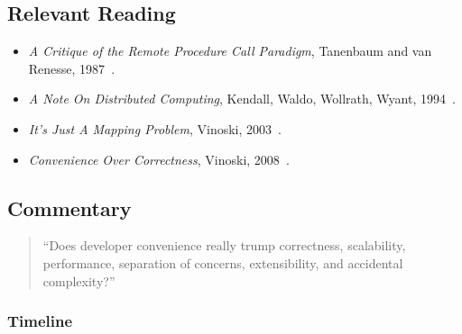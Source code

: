 \subsection{Relevant Reading}

\begin{itemize}
	\item \textit{A Critique of the Remote Procedure Call Paradigm}, Tanenbaum and van Renesse, 1987~\cite{tanenbaum1987critique}.
	\item \textit{A Note On Distributed Computing}, Kendall, Waldo, Wollrath, Wyant, 1994~\cite{kendall1994note}.
	\item \textit{It's Just A Mapping Problem}, Vinoski, 2003~\cite{vinoski2003s}.
	\item \textit{Convenience Over Correctness}, Vinoski, 2008~\cite{vinoski2008convenience}.
\end{itemize}

\subsection{Commentary}

\begin{quote}
``Does developer convenience really trump correctness, scalability,
performance, separation of concerns, extensibility, and accidental
complexity?''~\cite{vinoski2008convenience}
\end{quote}

\subsubsection{Timeline}


